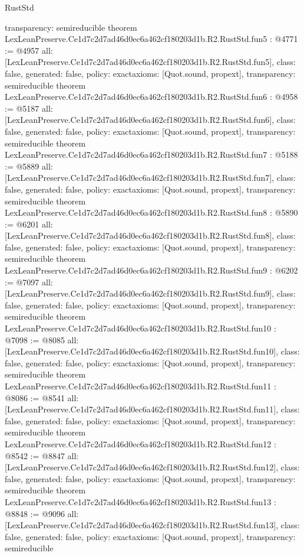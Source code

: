 \begin{lexlean}{RustStd}
\begin{coremodule}
{  transparency: semireducible
}
theorem LexLeanPreserve.Ce1d7c2d7ad46d0ec6a462cf180203d1b.R2.RustStd.fun5 : @4771 := @4957 {
  all: [LexLeanPreserve.Ce1d7c2d7ad46d0ec6a462cf180203d1b.R2.RustStd.fun5],
  class: false,
  generated: false,
  policy: exact{axioms: [Quot.sound, propext]},
  transparency: semireducible
}
theorem LexLeanPreserve.Ce1d7c2d7ad46d0ec6a462cf180203d1b.R2.RustStd.fun6 : @4958 := @5187 {
  all: [LexLeanPreserve.Ce1d7c2d7ad46d0ec6a462cf180203d1b.R2.RustStd.fun6],
  class: false,
  generated: false,
  policy: exact{axioms: [Quot.sound, propext]},
  transparency: semireducible
}
theorem LexLeanPreserve.Ce1d7c2d7ad46d0ec6a462cf180203d1b.R2.RustStd.fun7 : @5188 := @5889 {
  all: [LexLeanPreserve.Ce1d7c2d7ad46d0ec6a462cf180203d1b.R2.RustStd.fun7],
  class: false,
  generated: false,
  policy: exact{axioms: [Quot.sound, propext]},
  transparency: semireducible
}
theorem LexLeanPreserve.Ce1d7c2d7ad46d0ec6a462cf180203d1b.R2.RustStd.fun8 : @5890 := @6201 {
  all: [LexLeanPreserve.Ce1d7c2d7ad46d0ec6a462cf180203d1b.R2.RustStd.fun8],
  class: false,
  generated: false,
  policy: exact{axioms: [Quot.sound, propext]},
  transparency: semireducible
}
theorem LexLeanPreserve.Ce1d7c2d7ad46d0ec6a462cf180203d1b.R2.RustStd.fun9 : @6202 := @7097 {
  all: [LexLeanPreserve.Ce1d7c2d7ad46d0ec6a462cf180203d1b.R2.RustStd.fun9],
  class: false,
  generated: false,
  policy: exact{axioms: [Quot.sound, propext]},
  transparency: semireducible
}
theorem LexLeanPreserve.Ce1d7c2d7ad46d0ec6a462cf180203d1b.R2.RustStd.fun10 : @7098 := @8085 {
  all: [LexLeanPreserve.Ce1d7c2d7ad46d0ec6a462cf180203d1b.R2.RustStd.fun10],
  class: false,
  generated: false,
  policy: exact{axioms: [Quot.sound, propext]},
  transparency: semireducible
}
theorem LexLeanPreserve.Ce1d7c2d7ad46d0ec6a462cf180203d1b.R2.RustStd.fun11 : @8086 := @8541 {
  all: [LexLeanPreserve.Ce1d7c2d7ad46d0ec6a462cf180203d1b.R2.RustStd.fun11],
  class: false,
  generated: false,
  policy: exact{axioms: [Quot.sound, propext]},
  transparency: semireducible
}
theorem LexLeanPreserve.Ce1d7c2d7ad46d0ec6a462cf180203d1b.R2.RustStd.fun12 : @8542 := @8847 {
  all: [LexLeanPreserve.Ce1d7c2d7ad46d0ec6a462cf180203d1b.R2.RustStd.fun12],
  class: false,
  generated: false,
  policy: exact{axioms: [Quot.sound, propext]},
  transparency: semireducible
}
theorem LexLeanPreserve.Ce1d7c2d7ad46d0ec6a462cf180203d1b.R2.RustStd.fun13 : @8848 := @9096 {
  all: [LexLeanPreserve.Ce1d7c2d7ad46d0ec6a462cf180203d1b.R2.RustStd.fun13],
  class: false,
  generated: false,
  policy: exact{axioms: [Quot.sound, propext]},
  transparency: semireducible
}
\end{coremodule}
\end{lexlean}
